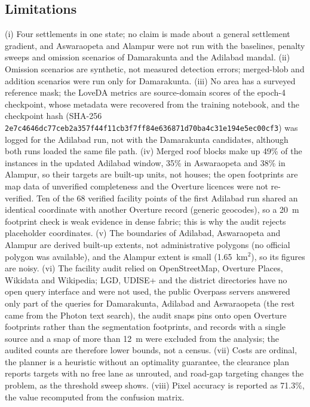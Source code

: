 \documentclass[12pt,a4paper]{article}
\begin{document}
\subsection{Limitations}
(i) Four settlements in one state; no claim is made about a general settlement gradient, and Aswaraopeta and Alampur were not run with the baselines, penalty sweeps and omission scenarios of Damarakunta and the Adilabad mandal. (ii) Omission scenarios are synthetic, not measured detection errors; merged-blob and addition scenarios were run only for Damarakunta. (iii) No area has a surveyed reference mask; the LoveDA metrics are source-domain scores of the epoch-4 checkpoint, whose metadata were recovered from the training notebook, and the checkpoint hash (SHA-256 \texttt{2e7c4646dc77ceb2\allowbreak a357f44f11cb3f7f\allowbreak f84e636871d70ba4\allowbreak c31e194e5ec00cf3}) was logged for the Adilabad run, not with the Damarakunta candidates, although both runs loaded the same file path. (iv) Merged roof blocks make up 49\% of the instances in the updated Adilabad window, 35\% in Aswaraopeta and 38\% in Alampur, so their targets are built-up units, not houses; the open footprints are map data of unverified completeness and the Overture licences were not re-verified. Ten of the 68 verified facility points of the first Adilabad run shared an identical coordinate with another Overture record (generic geocodes), so a 20~m footprint check is weak evidence in dense fabric; this is why the audit rejects placeholder coordinates. (v) The boundaries of Adilabad, Aswaraopeta and Alampur are derived built-up extents, not administrative polygons (no official polygon was available), and the Alampur extent is small (1.65~km$^2$), so its figures are noisy. (vi) The facility audit relied on OpenStreetMap, Overture Places, Wikidata and Wikipedia; LGD, UDISE+ and the district directories have no open query interface and were not used, the public Overpass servers answered only part of the queries for Damarakunta, Adilabad and Aswaraopeta (the rest came from the Photon text search), the audit snaps pins onto open Overture footprints rather than the segmentation footprints, and records with a single source and a snap of more than 12~m were excluded from the analysis; the audited counts are therefore lower bounds, not a census. (vii) Costs are ordinal, the planner is a heuristic without an optimality guarantee, the clearance plan reports targets with no free lane as unrouted, and road-gap targeting changes the problem, as the threshold sweep shows. (viii) Pixel accuracy is reported as 71.3\%, the value recomputed from the confusion matrix.
\end{document}
